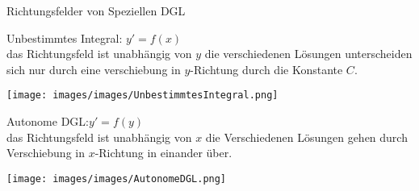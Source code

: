 \begin{definition}{Richtungsfelder von Speziellen DGL}\\
  \begin{minipage}{0.58\linewidth}
    Unbestimmtes Integral: \(y'=f(x)\)\\ das Richtungsfeld ist unabhängig von \(y\) die verschiedenen Lösungen
      unterscheiden sich nur durch eine verschiebung in \(y\)-Richtung durch die Konstante \(C\).
  \end{minipage}
  \begin{minipage}{0.4\linewidth}
    \begin{center}
      \texttt{[image: images/images/UnbestimmtesIntegral.png]}
      \end{center}
  \end{minipage}
  \begin{minipage}{0.58\linewidth}
    Autonome DGL:\(y'=f(y)\)\\ das Richtungsfeld ist unabhängig von \(x\) die Verschiedenen Lösungen gehen durch
    Verschiebung in \(x\)-Richtung in einander über.
  \end{minipage}
  \begin{minipage}{0.4\linewidth}
    \begin{center}
      \texttt{[image: images/images/AutonomeDGL.png]}
      \end{center}
  \end{minipage}
\end{definition}






